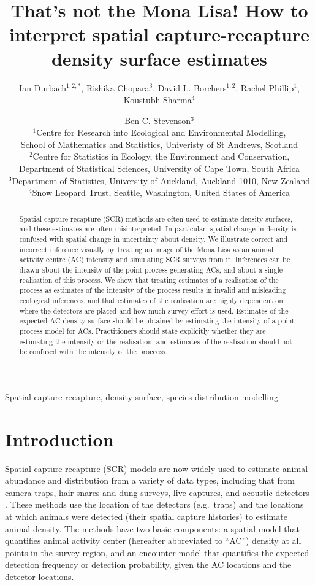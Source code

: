 \documentclass[useAMS,usenatbib,referee]{biom}
\title[How to interpret SCR density surface estimates]{That's not the Mona Lisa! How to interpret spatial capture-recapture density surface estimates}
\author{Ian Durbach$^{1,2,*}$, Rishika Chopara$^{3}$, David L. Borchers$^{1,2}$, Rachel Phillip$^{1}$, Koustubh Sharma$^{4}$ \and Ben C. Stevenson$^{3}$ \\
$^{1}$Centre for Research into Ecological and Environmental Modelling, \\ School of Mathematics and Statistics, Univeristy of St Andrews, Scotland \\
$^{2}$Centre for Statistics in Ecology, the Environment and Conservation, \\ Department of Statistical Sciences, University of Cape Town, South Africa \\
$^{3}$Department of Statistics, University of Auckland, Auckland 1010, New Zealand \\
$^{4}$Snow Leopard Trust, Seattle, Washington, United States of America \\
\email{indurbach@gmail.com}}
\begin{document}

\begin{abstract}
Spatial capture-recapture (SCR) methods are often used to estimate density surfaces, and these estimates are often misinterpreted. In particular, spatial change in density is confused with spatial change in uncertainty about density. We illustrate correct and incorrect inference visually by treating an image of the Mona Lisa as an animal activity centre (AC) intensity and simulating SCR surveys from it. Inferences can be drawn about the intensity of the point process generating ACs, and about a single realisation of this process. We show that treating estimates of a realisation of the process as estimates of the intensity of the process results in invalid and misleading ecological inferences, and that estimates of the realisation are highly dependent on where the detectors are placed and how much survey effort is used. Estimates of the expected AC density surface should be obtained by estimating the intensity of a point process model for ACs. Practitioners should state explicitly whether they are estimating the intensity or the realisation, and estimates of the realisation should not be confused with the intensity of the procecss.
\end{abstract}

\begin{keywords}
Spatial capture-recapture, density surface, species distribution modelling
\end{keywords}

\maketitle 

\section{Introduction}

Spatial capture-recapture (SCR) models \citep*{Efford:04,Borchers+Efford:08, Royle+Young:08} are now widely used to estimate animal abundance and distribution from a variety of data types, including that from camera-traps, hair snares and dung surveys, live-captures, and acoustic detectors%
. These methods use the location of the detectors (e.g.\ traps) and the locations at which animals were detected (their spatial capture histories) to estimate animal density. The methods have two basic components: a spatial model that quantifies animal activity center (hereafter abbreviated to ``AC'') density at all points in the survey region, and an encounter model that quantifies the expected detection frequency or detection probability, given the AC locations and the detector locations. 
\end{document}
